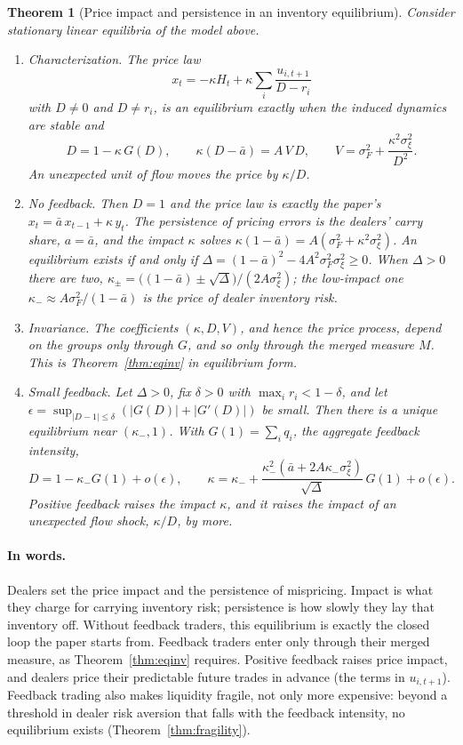\documentclass[12pt]{article}
\newtheorem{theorem}{Theorem}[section]
\theoremstyle{definition}
\theoremstyle{remark}
\begin{document}
\begin{theorem}[Price impact and persistence in an inventory equilibrium]\label{thm:inventory}
Consider stationary linear equilibria of the model above.
\begin{enumerate}[label=(\roman*),itemsep=1pt]
\item \emph{Characterization.} The price law
\[
 x_t=-\kappa H_t+\kappa\sum_i\frac{u_{i,t+1}}{D-r_i}
\]
with $D\ne0$ and $D\ne r_i$, is an equilibrium exactly when the induced dynamics are stable and
\begin{equation}\label{eq:inventory_eq}
 D=1-\kappa\,G(D),\qquad \kappa(D-\bar a)=A\,V\,D,\qquad V=\sigma_F^2+\frac{\kappa^2\sigma_\xi^2}{D^2}.
\end{equation}
An unexpected unit of flow moves the price by $\kappa/D$.
\item \emph{No feedback.} Then $D=1$ and the price law is exactly the paper's $x_t=\bar a\,x_{t-1}+\kappa\,y_t$. The persistence of pricing errors is the dealers' carry share, $a=\bar a$, and the impact $\kappa$ solves $\kappa(1-\bar a)=A(\sigma_F^2+\kappa^2\sigma_\xi^2)$. An equilibrium exists if and only if $\Delta=(1-\bar a)^2-4A^2\sigma_F^2\sigma_\xi^2\ge0$. When $\Delta>0$ there are two, $\kappa_\pm=\bigl((1-\bar a)\pm\sqrt\Delta\bigr)/(2A\sigma_\xi^2)$; the low-impact one $\kappa_-\approx A\sigma_F^2/(1-\bar a)$ is the price of dealer inventory risk.
\item \emph{Invariance.} The coefficients $(\kappa,D,V)$, and hence the price process, depend on the groups only through $G$, and so only through the merged measure $M$. This is Theorem~\ref{thm:eqinv} in equilibrium form.
\item \emph{Small feedback.} Let $\Delta>0$, fix $\delta>0$ with $\max_ir_i<1-\delta$, and let $\epsilon=\sup_{|D-1|\le\delta}(|G(D)|+|G'(D)|)$ be small. Then there is a unique equilibrium near $(\kappa_-,1)$. With $G(1)=\sum_iq_i$, the aggregate feedback intensity,
\[
 D=1-\kappa_-G(1)+o(\epsilon),\qquad \kappa=\kappa_-+\frac{\kappa_-^2(\bar a+2A\kappa_-\sigma_\xi^2)}{\sqrt\Delta}\,G(1)+o(\epsilon).
\]
Positive feedback raises the impact $\kappa$, and it raises the impact of an unexpected flow shock, $\kappa/D$, by more.
\end{enumerate}
\end{theorem}

\paragraph{In words.} Dealers set the price impact and the persistence of mispricing. Impact is what they charge for carrying inventory risk; persistence is how slowly they lay that inventory off. Without feedback traders, this equilibrium is exactly the closed loop the paper starts from. Feedback traders enter only through their merged measure, as Theorem~\ref{thm:eqinv} requires. Positive feedback raises price impact, and dealers price their predictable future trades in advance (the terms in $u_{i,t+1}$). Feedback trading also makes liquidity fragile, not only more expensive: beyond a threshold in dealer risk aversion that falls with the feedback intensity, no equilibrium exists (Theorem~\ref{thm:fragility}).
\end{document}
